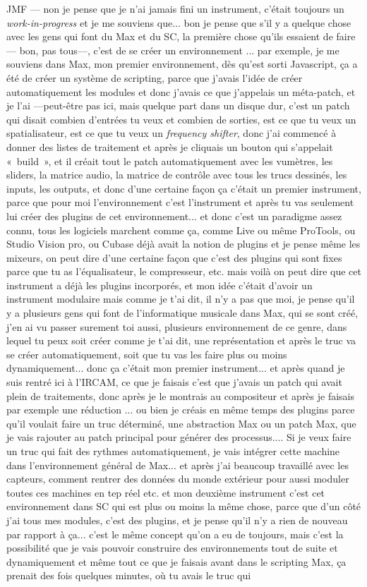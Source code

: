 JMF — non je pense que je n'ai jamais fini un instrument, c'était toujours un \textit{work-in-progress} et je me souviens que... bon je pense que s'il y a quelque chose avec les gens qui font du Max et du SC, la première chose qu'ils essaient de faire — bon, pas tous—, c'est de se créer un environnement ... par exemple, je me souviens dans Max, mon premier environnement, dès qu'est sorti Javascript, ça a été de créer un système de scripting, parce que j'avais l'idée de créer automatiquement les modules et donc j'avais ce que j'appelais un méta-patch, et je l'ai —peut-être pas ici, mais quelque part dans un disque dur, c'est un patch qui disait combien d'entrées tu veux et combien de sorties, est ce que tu veux un spatialisateur, est ce que tu veux un \textit{frequency shifter}, donc j'ai commencé à donner des listes de traitement et après je cliquais un bouton qui s'appelait « build », et il créait tout le patch automatiquement avec les vumètres, les sliders, la matrice audio, la matrice de contrôle avec tous les trucs dessinés, les inputs, les outputs, et donc d'une certaine façon ça c'était un premier instrument, parce que pour moi l'environnement c'est l'instrument et après tu vas seulement lui créer des plugins de cet environnement... et donc c'est un paradigme assez connu, tous les logiciels marchent comme ça, comme Live ou même ProTools, ou Studio Vision pro, ou Cubase déjà avait la notion de plugins et je pense même les mixeurs, on peut dire d'une certaine façon que c'est des plugins qui sont fixes parce que tu as l'équalisateur, le compresseur, etc. mais voilà on peut dire que cet instrument a déjà les plugins incorporés, et mon idée c'était d'avoir un instrument modulaire mais comme je t'ai dit, il n'y a pas que moi, je pense qu'il y a plusieurs gens qui font de l'informatique musicale dans Max, qui se sont créé, j'en ai vu passer surement toi aussi, plusieurs environnement de ce genre, dans lequel tu peux soit créer comme je t'ai dit, une représentation et après le truc va se créer automatiquement, soit que tu vas les faire plus ou moins dynamiquement... donc ça c'était mon premier instrument... et après quand je suis rentré ici à l'IRCAM, ce que je faisais c'est que j'avais un patch qui avait plein de traitements, donc après je le montrais au compositeur et après je faisais par exemple une réduction ... ou bien je créais en même temps des plugins parce qu'il voulait faire un truc déterminé, une abstraction Max ou un patch Max, que je vais rajouter au patch principal pour générer des processus.... Si je veux faire un truc qui fait des rythmes automatiquement, je vais intégrer cette machine dans l'environnement général de Max... et après j'ai beaucoup travaillé avec les capteurs, comment rentrer des données du monde extérieur pour aussi moduler toutes ces machines en tep réel etc. et mon deuxième instrument c'est cet environnement dans SC qui est plus ou moins la même chose, parce que d'un côté j'ai tous mes modules, c'est des plugins, et je pense qu'il n'y a rien de nouveau par rapport à ça... c'est le même concept qu'on a eu de toujours, mais c'est la possibilité que je vais pouvoir construire des environnements tout de suite et dynamiquement et même tout ce que je faisais avant dans le scripting Max, ça prenait des fois quelques minutes, où tu avais le truc qui 